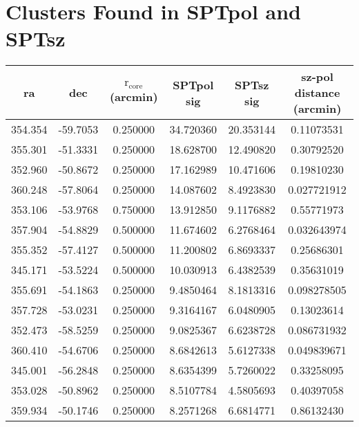 \documentclass{article}
\begin{document}
\section{Clusters Found in SPTpol and SPTsz}
\begin{tabular}{| c | c | c | c | c | c |}
  \hline
  ra & dec & $\mathrm{r}_\mathrm{core}$ (arcmin) & SPTpol sig & SPTsz sig & sz-pol distance (arcmin) \\
  \hline
      354.354 &      -59.7053 &      0.250000 &        34.720360 & 
       20.353144 &       0.11073531\\
      355.301 &      -51.3331 &      0.250000 &        18.628700 & 
       12.490820 &       0.30792520\\
      352.960 &      -50.8672 &      0.250000 &        17.162989 & 
       10.471606 &       0.19810230\\
      360.248 &      -57.8064 &      0.250000 &        14.087602 & 
       8.4923830 &      0.027721912\\
      353.106 &      -53.9768 &      0.750000 &        13.912850 & 
       9.1176882 &       0.55771973\\
      357.904 &      -54.8829 &      0.500000 &        11.674602 & 
       6.2768464 &      0.032643974\\
      355.352 &      -57.4127 &      0.500000 &        11.200802 & 
       6.8693337 &       0.25686301\\
      345.171 &      -53.5224 &      0.500000 &        10.030913 & 
       6.4382539 &       0.35631019\\
      355.691 &      -54.1863 &      0.250000 &        9.4850464 & 
       8.1813316 &      0.098278505\\
      357.728 &      -53.0231 &      0.250000 &        9.3164167 & 
       6.0480905 &       0.13023614\\
      352.473 &      -58.5259 &      0.250000 &        9.0825367 & 
       6.6238728 &      0.086731932\\
      360.410 &      -54.6706 &      0.250000 &        8.6842613 & 
       5.6127338 &      0.049839671\\
      345.001 &      -56.2848 &      0.250000 &        8.6354399 & 
       5.7260022 &       0.33258095\\
      353.028 &      -50.8962 &      0.250000 &        8.5107784 & 
       4.5805693 &       0.40397058\\
      359.934 &      -50.1746 &      0.250000 &        8.2571268 & 
       6.6814771 &       0.86132430\\

\end{tabular}
\end{document}
